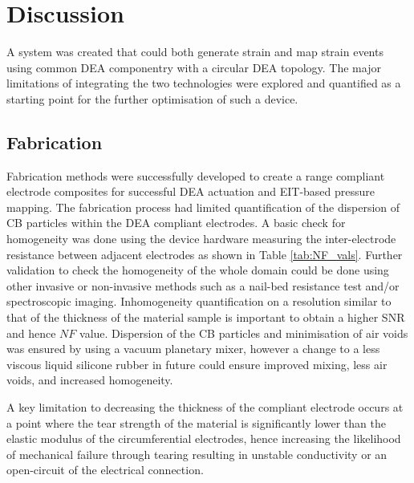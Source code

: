 \section{Discussion}
\label{sec:disscusion}
A system was created that could both generate strain and map strain events using common DEA componentry with a circular DEA topology. The major limitations of integrating the two technologies were explored and quantified as a starting point for the further optimisation of such a device. 


\subsection{Fabrication}
Fabrication methods were successfully developed to create a range compliant electrode composites for successful DEA actuation and EIT-based pressure mapping. The fabrication process had limited quantification of the dispersion of CB particles within the DEA compliant electrodes. A basic check for homogeneity was done using the device hardware measuring the inter-electrode resistance between adjacent electrodes as shown in Table \ref{tab:NF_vals}. Further validation to check the homogeneity of the whole domain could be done using other invasive or non-invasive methods such as a nail-bed resistance test and/or spectroscopic imaging. Inhomogeneity quantification on a resolution similar to that of the thickness of the material sample is important to obtain a higher SNR and hence $N\!F$ value. Dispersion of the CB particles and minimisation of air voids was ensured by using a vacuum planetary mixer, however a change to a less viscous liquid silicone rubber in future could ensure improved mixing, less air voids, and increased homogeneity. 

A key limitation to decreasing the thickness of the compliant electrode occurs at a point where the tear strength of the material is significantly lower than the elastic modulus of the circumferential electrodes, hence increasing the likelihood of mechanical failure through tearing resulting in unstable conductivity or an open-circuit of the electrical connection.

